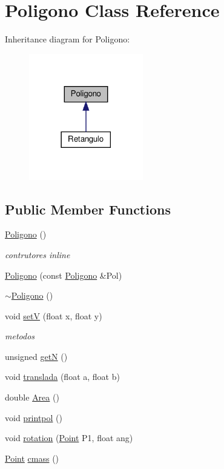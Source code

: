 \hypertarget{classPoligono}{}\section{Poligono Class Reference}
\label{classPoligono}


Inheritance diagram for Poligono\+:\nopagebreak
\begin{figure}[H]
\begin{center}
\leavevmode
\includegraphics[width=141pt]{classPoligono__inherit__graph}
\end{center}
\end{figure}
\subsection*{Public Member Functions}
\begin{DoxyCompactItemize}
\item 
\hyperlink{classPoligono_a9311a9a1496878c09c8508b3636e2870}{Poligono} ()
\begin{DoxyCompactList}\small\item\em contrutores inline \end{DoxyCompactList}\item 
\hyperlink{classPoligono_a7d2e73767b8dc1bce595f0f286d0e85a}{Poligono} (const \hyperlink{classPoligono}{Poligono} \&Pol)
\item 
\hyperlink{classPoligono_a4dd7136ee506cb4355cbdc724c55a4a0}{$\sim$\+Poligono} ()
\item 
void \hyperlink{classPoligono_a15dd684ea903a4eb5ba8671d57facb82}{setV} (float x, float y)
\begin{DoxyCompactList}\small\item\em metodos \end{DoxyCompactList}\item 
unsigned \hyperlink{classPoligono_abb6eef3e304cb28501356fd5512b0890}{getN} ()
\item 
void \hyperlink{classPoligono_adbf605dfd0419b7301c9be0ec1dbe41b}{translada} (float a, float b)
\item 
double \hyperlink{classPoligono_a76e434d95055f6c94fdcf3c314d44be0}{Area} ()
\item 
void \hyperlink{classPoligono_a8c696d750b78769e9b2e04790dac9195}{printpol} ()
\item 
void \hyperlink{classPoligono_a8891a75b7f11bd764a99f296145e26dd}{rotation} (\hyperlink{classPoint}{Point} P1, float ang)
\item 
\hyperlink{classPoint}{Point} \hyperlink{classPoligono_a9f5148c45bc074be28664efc717e5968}{cmass} ()
\end{DoxyCompactItemize}


